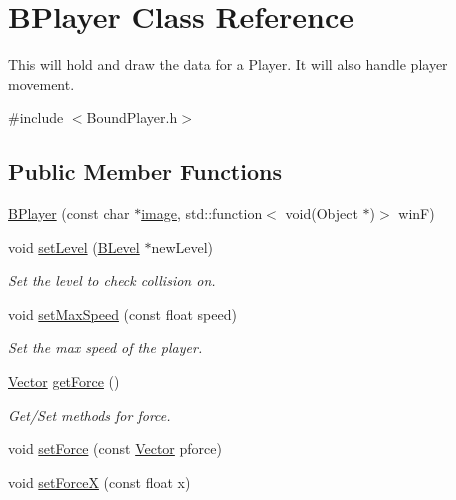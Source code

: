 \hypertarget{class_b_player}{\section{\-B\-Player \-Class \-Reference}
\label{class_b_player}
}


\-This will hold and draw the data for a \-Player. \-It will also handle player movement.  




{\ttfamily \#include $<$\-Bound\-Player.\-h$>$}

\subsection*{\-Public \-Member \-Functions}
\begin{DoxyCompactItemize}
\item 
\hyperlink{class_b_player_af15d206fbe7550cf2fa15746f2a9a2f2}{\-B\-Player} (const char $\ast$\hyperlink{_game_list_8h_ac745ab21f82aa96829863dcfc37ef5a8}{image}, std\-::function$<$ void(\-Object $\ast$)$>$ win\-F)
\item 
void \hyperlink{class_b_player_a03add0a9a55d81912897518d94daf52f}{set\-Level} (\hyperlink{class_b_level}{\-B\-Level} $\ast$new\-Level)
\begin{DoxyCompactList}\small\item\em \-Set the level to check collision on. \end{DoxyCompactList}\item 
void \hyperlink{class_b_player_ace0ec1b13a62c932950a86a469d0263f}{set\-Max\-Speed} (const float speed)
\begin{DoxyCompactList}\small\item\em \-Set the max speed of the player. \end{DoxyCompactList}\item 
\hyperlink{struct_vector}{\-Vector} \hyperlink{class_b_player_a33b7d635e3aa3c7a4796eabc4205cc58}{get\-Force} ()
\begin{DoxyCompactList}\small\item\em \-Get/\-Set methods for force. \end{DoxyCompactList}\item 
void \hyperlink{class_b_player_ae97ab8470903f7c595939f2331b6c6f4}{set\-Force} (const \hyperlink{struct_vector}{\-Vector} pforce)
\item 
void \hyperlink{class_b_player_af7ae69e5c1d7880a5ebf4bd38c1adabb}{set\-Force\-X} (const float x)
\item 

\end{DoxyCompactItemize}
